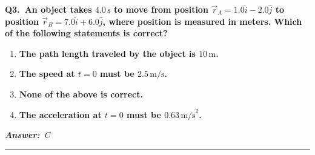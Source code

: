 \documentclass[11pt]{article}
\newcommand{\QuestionStyle}[1]{{\large\bfseries\boldmath #1}}
\newcommand{\AnswerStyle}[1]{{\large\bfseries\boldmath #1}}
\newcommand{\ReasonStyle}[1]{{\normalsize #1}}
\newif\ifshowreason
\newcommand{\Correct}[2]{%
  \item \AnswerStyle{\textcolor{AnsRed}{#1}}%
  \ifshowreason\\[-0.2em]
    \ReasonStyle{\textcolor{AnsRed}{#2}}%
  \fi
}
\newcommand{\Wrong}[2]{%
  \item \AnswerStyle{\textcolor{WrongBlue}{#1}}%
  \ifshowreason\\[-0.2em]
    \ReasonStyle{\textcolor{WrongBlue}{#2}}%
  \fi
}
\newcommand{\QBlock}[4]{%
  \Needspace{8\baselineskip}%
  \noindent
  \begin{minipage}{\linewidth}
    \QuestionStyle{#1.~#2}

    \vspace{0.25em}
    \begin{enumerate}
      #3
    \end{enumerate}

    \vspace{0.1em}
    \noindent\textcolor{AnsRed}{\textit{\textbf{Answer:}~#4}}

    \vspace{0.25em}
    \hrule height 0.4pt
  \end{minipage}
  \vspace{0.75em}
}
\begin{document}
\QBlock{Q3}{An object takes $4.0\,\text{s}$ to move from position $\vec r_A=1.0\hat{i}-2.0\hat{j}$ to position $\vec r_B=7.0\hat{i}+6.0\hat{j}$, where position is measured in meters. Which of the following statements is correct?}{
\Wrong{The path length traveled by the object is $10\,\text{m}$.}{This uses the displacement magnitude, $\sqrt{(7-1)^2+(6-(-2))^2}=10\,\text{m}$, as though it were the actual distance traveled along the path. The path length depends on the trajectory and cannot be determined from just the initial and final positions.}
\Wrong{The speed at $t=0$ must be $2.5\,\text{m/s}$.}{This comes from dividing the displacement magnitude by the total time to get $10/4=2.5\,\text{m/s}$, then incorrectly interpreting that as the initial speed. That calculation gives neither the initial speed nor necessarily even the average speed along the actual path.}
\Correct{None of the above is correct.}{From the given data, we can determine only the displacement, $\Delta\vec r=(6\hat{i}+8\hat{j})\,\text{m}$, whose magnitude is $|\Delta\vec r|=10\,\text{m}$. However, the actual path length, the speed at $t=0$, and the acceleration at $t=0$ are not uniquely determined by just two positions and one elapsed time, so the other statements are not necessarily true.}
\Wrong{The acceleration at $t=0$ must be $0.63\,\text{m/s}^2$.}{This assigns a specific acceleration value from insufficient information. Infinitely many possible motions can connect the same start and end positions in $4.0\,\text{s}$, each with different accelerations.}
}{C}
\end{document}
